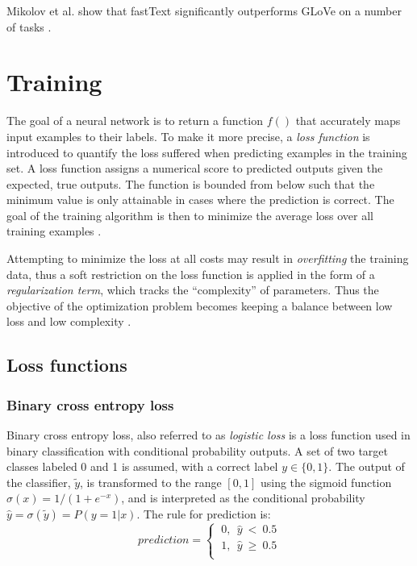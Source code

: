 Mikolov et al. show that fastText significantly outperforms GLoVe on a number of tasks \cite{mikolov2017}.


\section{Training} \label{Training}
The goal of a neural network is to return a function $f()$ that accurately maps input examples to their labels.
To make it more precise, a \textit{loss function} is introduced to quantify the loss suffered when predicting examples in the training set.
A loss function assigns a numerical score to predicted outputs given the expected, true outputs.
The function is bounded from below such that the minimum value is only attainable in cases where the prediction is correct.
The goal of the training algorithm is then to minimize the average loss over all training examples \cite{goldberg2017}.

Attempting to minimize the loss at all costs may result in \textit{overfitting} the training data, thus a soft restriction on the loss function is applied in the form of a \textit{regularization term}, which tracks the ``complexity'' of parameters.
Thus the objective of the optimization problem becomes keeping a balance between low loss and low complexity \cite{goldberg2017}.

\subsection{Loss functions}\label{Loss functions}
\subsubsection{Binary cross entropy loss}\label{Binary cross entropy loss}
Binary cross entropy loss, also referred to as \textit{logistic loss} is a loss function used in binary classification with conditional probability outputs.
A set of two target classes labeled 0 and 1 is assumed, with a correct label $y\in{}\{0,1\}$.
The output of the classifier, $\tilde{y}$, is transformed to the range $[0, 1]$ using the sigmoid function $\sigma{}(x)=1/(1+e^{-x})$, and is interpreted as the conditional probability $\hat{y}=\sigma{}(\tilde{y}) = P(y=1|x)$.
The rule for prediction is:
\begin{equation}
prediction =
\begin{cases}
  \  0,\ \ \hat{y}\ <\ 0.5\\
  \ 1,\ \ \hat{y}\ \geq \ 0.5\\
\end{cases}
\end{equation}

